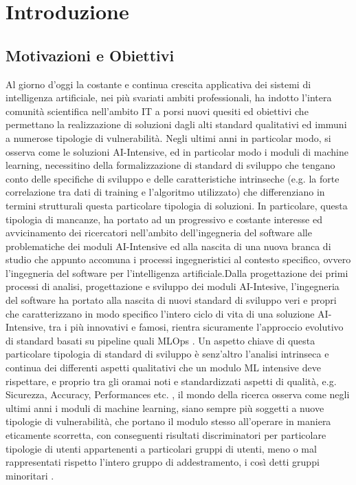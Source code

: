 \chapter{Introduzione}

\section{Motivazioni e Obiettivi} %
Al giorno d'oggi la costante e continua crescita applicativa dei sistemi di intelligenza artificiale, nei più svariati ambiti professionali, ha indotto l'intera comunità scientifica nell'ambito IT a porsi nuovi quesiti ed obiettivi che permettano la realizzazione di soluzioni dagli alti standard qualitativi ed immuni a numerose tipologie di vulnerabilità. Negli ultimi anni in particolar modo, si osserva come le soluzioni AI-Intensive, ed in particolar modo i moduli di machine learning, necessitino della formalizzazione di standard di sviluppo che tengano conto delle specifiche di sviluppo e delle caratteristiche intrinseche (e.g. la forte correlazione tra dati di training e l'algoritmo utilizzato) che differenziano in termini strutturali questa particolare tipologia di soluzioni. In particolare, questa tipologia di mancanze, ha portato ad un progressivo e costante interesse ed avvicinamento dei ricercatori nell'ambito dell'ingegneria del software alle problematiche dei moduli AI-Intensive \cite{rech2004artificial} ed alla nascita di una nuova branca di studio che appunto accomuna i processi ingegneristici al contesto specifico, ovvero l'ingegneria del software per l'intelligenza artificiale.Dalla progettazione dei primi processi di analisi, progettazione e sviluppo dei moduli AI-Intesive, l'ingegneria del software ha portato alla nascita di nuovi standard di sviluppo veri e propri che caratterizzano in modo specifico l'intero ciclo di vita di una soluzione AI-Intensive, tra i più innovativi e famosi, rientra sicuramente l'approccio evolutivo di standard basati su pipeline quali MLOps \cite{burkov2020machine}. Un aspetto chiave di questa particolare tipologia di standard di sviluppo è senz'altro l'analisi intrinseca e continua dei differenti aspetti qualitativi che un modulo ML intensive deve rispettare, e proprio tra gli oramai noti e standardizzati aspetti di qualità, e.g. Sicurezza, Accuracy, Performances etc. \cite{NFRForML}, il mondo della ricerca osserva come negli ultimi anni i moduli di machine learning, siano sempre più soggetti a nuove tipologie di vulnerabilità, che portano il modulo stesso all'operare in maniera eticamente scorretta, con conseguenti risultati discriminatori per particolare tipologie di utenti appartenenti a particolari gruppi di utenti, meno o mal rappresentati rispetto l'intero gruppo di addestramento, i così detti gruppi minoritari \cite{brun2018software}. \\

